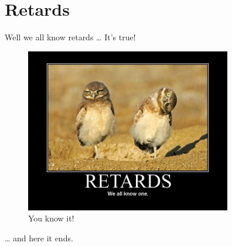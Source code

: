 \documentclass[a4paper,12pt]{article} %
\begin{document}
\newpage %
\section{Retards} %

Well we all know retards \ldots{} It's true!

\begin{figure}[ht!] %
\centering %
\includegraphics[width=90mm]{birds.jpg} %
\caption{You know it!} %
\label{overflow}
\end{figure} %

\ldots{} and here it ends.
\end{document}

